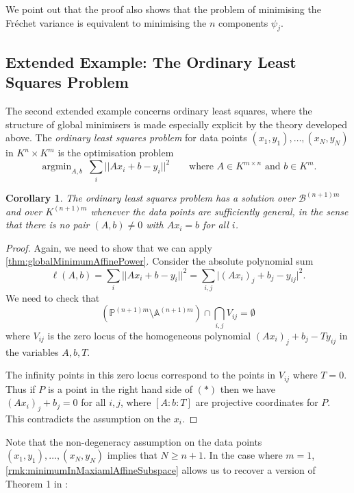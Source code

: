 \documentclass[10pt]{article}
\newtheorem{corollary}[theorem]{Corollary}
\theoremstyle{definition}
\newcommand{\PP}{\mathbb{P}}
\DeclareMathOperator*{\argmin}{\text{argmin}}
\begin{document}
We point out that the proof also shows that the problem of minimising the Fr\'echet variance is equivalent to minimising the $n$ components $\psi_j$.

\subsection{Extended Example: The Ordinary Least Squares Problem}

The second extended example concerns ordinary least squares, where the structure of global minimisers is made especially explicit by the theory developed above. The \emph{ordinary least squares problem} for data points $(x_1, y_1), \dotsc, (x_N, y_N)$ in $K^n \times K^{m}$ is the optimisation problem
$$
    \argmin_{A, b} \ \sum_i ||A x_i + b - y_i||^2 \qquad\text{where } A \in K^{m \times n} \text{ and } b \in K^{m}.
$$

\begin{corollary} \label{cor:ordinaryLeastSquares}
  The ordinary least squares problem has a solution over $\mathcal B ^ {(n+1)m}$ and over $K ^ {(n+1)m}$ whenever the data points are sufficiently general, in the sense that there is no pair $(A, b) \ne 0$ with $A x_i = b$ for all $i$.
\end{corollary}

\begin{proof}
    Again, we need to show that we can apply \cref{thm:globalMinimumAffinePower}. Consider the absolute polynomial sum
    $$
        \ell(A, b) = \sum_i \lvert \lvert A x_i + b - y_i \rvert \rvert ^2 = \sum_{i, j}  \lvert (A x_i)_j + b_j - y_{ij} \rvert ^2.
    $$
    We need to check that
    \begin{equation*}
        (\PP^{(n+1)m} \setminus \mathbb{A}^{(n+1)m}) \cap \bigcap_{i, j} V_{ij} = \emptyset
    \end{equation*}
    where $V_{ij}$ is the zero locus of the homogeneous polynomial $(A x_i)_j + b_j - Ty_{ij}$ in the variables $A, b, T$.

    The infinity points in this zero locus correspond to the points in $V_{ij}$ where $T = 0$. Thus if $P$ is a point in the right hand side of $(*)$ then we have
    $
    (A x_i)_j + b_j = 0
    $
    for all $i, j$, where $[A : b : T]$ are projective coordinates for $P$. This contradicts the assumption on the $x_i$.
\end{proof}

Note that the non-degeneracy assumption on the data points $(x_1, y_1), \dotsc, (x_N, y_N)$ implies that $N \ge n + 1$.
In the case where $m = 1$, \cref{rmk:minimumInMaxiamlAffineSubspace} allows us to recover a version of Theorem 1 in \cite{BMP2025}:
\end{document}
